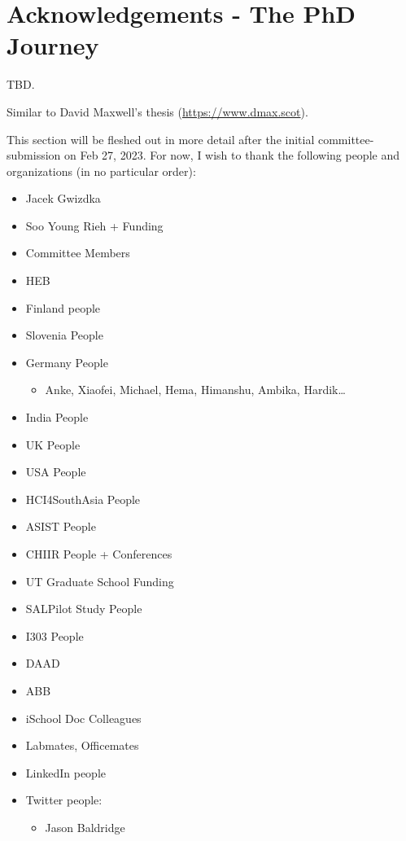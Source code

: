 \documentclass[letterpaper, nobind]{templates/ociamthesis}
\providecommand{\tightlist}{%
  \setlength{\itemsep}{0pt}\setlength{\parskip}{0pt}}
\begin{document}
\hypertarget{sec-app-ack}{%
\chapter{Acknowledgements - The PhD Journey}\label{sec-app-ack}}

TBD.

Similar to David Maxwell's thesis (\url{https://www.dmax.scot}).

This section will be fleshed out in more detail after the initial committee-submission on Feb 27, 2023.
For now, I wish to thank the following people and organizations (in no particular order):

\begin{itemize}
\tightlist
\item
  Jacek Gwizdka
\item
  Soo Young Rieh + Funding
\item
  Committee Members
\item
  HEB
\item
  Finland people
\item
  Slovenia People
\item
  Germany People

  \begin{itemize}
  \tightlist
  \item
    Anke, Xiaofei, Michael, Hema, Himanshu, Ambika, Hardik\ldots{}
  \end{itemize}
\item
  India People
\item
  UK People
\item
  USA People
\item
  HCI4SouthAsia People
\item
  ASIST People
\item
  CHIIR People + Conferences
\item
  UT Graduate School Funding
\item
  SALPilot Study People
\item
  I303 People
\item
  DAAD
\item
  ABB
\item
  iSchool Doc Colleagues
\item
  Labmates, Officemates
\item
  LinkedIn people
\item
  Twitter people:

  \begin{itemize}
  \tightlist
  \item
    Jason Baldridge
  \end{itemize}
\end{itemize}
\end{document}
